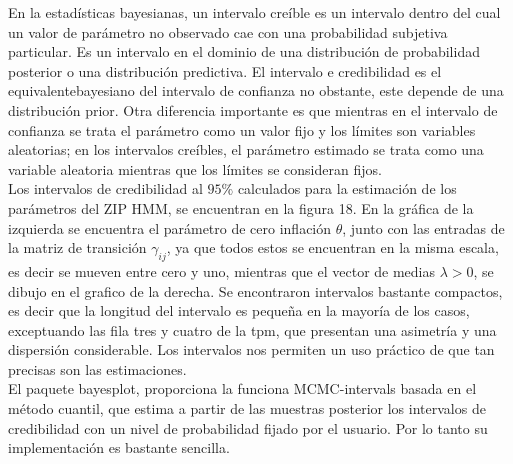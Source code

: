 \documentclass[a4paper]{article}\usepackage[]{graphicx}\usepackage[]{color}
\begin{document}
En la estadísticas bayesianas, un intervalo creíble es un intervalo dentro del cual un valor de parámetro no observado cae con una probabilidad subjetiva particular. Es un intervalo en el dominio de una distribución de probabilidad posterior o una distribución predictiva. El intervalo e credibilidad es el equivalentebayesiano del intervalo de confianza no obstante, este depende de una distribución prior. Otra diferencia importante es que mientras en el intervalo de confianza se trata el parámetro como un valor fijo y los límites son variables aleatorias; en los intervalos creíbles, el parámetro estimado se trata como una variable aleatoria mientras que los límites se consideran fijos.
\\
Los intervalos de credibilidad al $95 \%$ calculados para la estimación de los parámetros del ZIP HMM, se encuentran en la figura 18. En la gráfica de la izquierda se encuentra el parámetro de cero inflación $\theta$, junto con las entradas de la matriz de transición $\gamma_{ij}$, ya que todos estos se encuentran en la misma escala, es decir se mueven entre cero y uno, mientras que el vector de medias $\lambda > 0$, se dibujo en el grafico de la derecha. Se encontraron intervalos bastante compactos, es decir que la longitud del intervalo es pequeña en la mayoría de los casos, exceptuando las fila tres y cuatro de la tpm, que presentan una asimetría y una dispersión considerable. Los intervalos nos permiten un uso práctico de que tan precisas son las estimaciones.
\\
El paquete bayesplot, proporciona la funciona MCMC-intervals basada en el método cuantil, que estima a partir de las muestras posterior los intervalos de credibilidad con un nivel de probabilidad fijado por el usuario. Por lo tanto su implementación es bastante sencilla.
\end{document}
